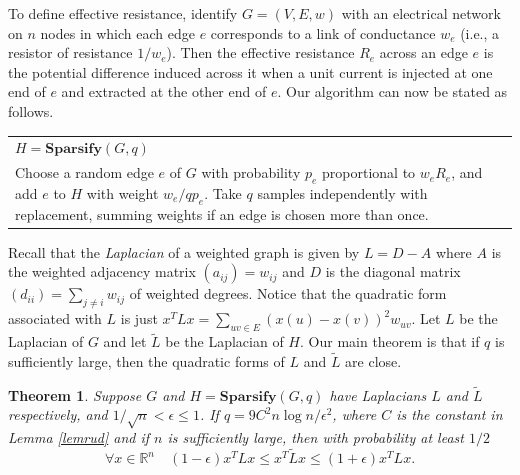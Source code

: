 \documentclass[11pt]{article}
\newtheorem{thm}[lem]{Theorem}
\newcommand{\R}{\mathbb{R}}
\begin{document}
To define effective resistance, identify $G=(V,E,w)$ with an electrical network on $n$ nodes in which each edge
$e$ corresponds to a link of conductance $w_e$ (i.e., a resistor of resistance $1/w_e$).
Then the effective resistance $R_e$ across an
edge $e$ is the potential difference induced across it when a unit current
is injected at one end of $e$ and extracted at the other end of $e$. 
Our algorithm can now be stated as follows.
\begin{center}
\begin{tabular}[c]{p{6in}}
\hline
$H=\textbf{Sparsify}(G,q)$\\
Choose a random edge $e$ of $G$ with probability $p_e$ proportional to
$w_eR_e$,
and add $e$ to $H$ with weight $w_e/qp_e$.
Take $q$ samples independently with replacement,
summing weights if an edge is chosen more than once.\\
\hline
\end{tabular}
\end{center}

Recall that the {\em Laplacian} of a weighted graph is given by $L=D-A$ where $A$ is the weighted
adjacency matrix $(a_{ij})=w_{ij}$ and $D$ is the diagonal matrix $(d_{ii})=\sum_{j\ne i}w_{ij}$ of weighted degrees.
Notice that the quadratic form associated with $L$ is just $x^TLx=\sum_{uv\in E}(x(u)-x(v))^2w_{uv}$.
Let $L$ be the Laplacian of $G$ and let $\tilde{L}$ be the Laplacian of $H$. Our main theorem is that
if $q$ is sufficiently large, then the quadratic forms of $L$ and $\tilde{L}$ are close.

\begin{thm}\label{mainthm} Suppose $G$ and $H=\mathbf{Sparsify}(G,q)$ have
Laplacians $L$ and $\tilde{L}$ respectively, 
and $1/\sqrt{n}<\epsilon\le 1$. If $q=9C^2n\log n/\epsilon^2$, where $C$ is the constant in Lemma \ref{lemrud} and if $n$ is sufficiently large, 
then with probability at least $1/2$
\begin{equation}\label{xtlx} \forall x\in\R^n\quad (1-\epsilon)x^TLx\le x^T\tilde{L}x\le
(1+\epsilon)x^TLx.\end{equation}
\end{thm}
\end{document}
